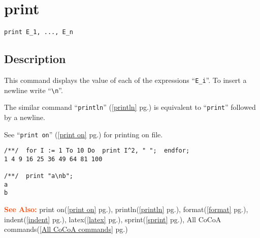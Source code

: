 \documentclass[a4paper]{mybook}
\newenvironment{command}{}{} %
\newcommand\SeeAlso{\par\textcolor{OrangeRed}{\textbf{\large See Also: }}}
\begin{document}
\section{print}
\label{print}
\begin{command} %


\begin{Verbatim}[label=syntax, rulecolor=\color{MidnightBlue},
frame=single]
print E_1, ..., E_n
\end{Verbatim}


\subsection*{Description}

This command displays the value of each of the expressions ``\verb&E_i&''.
To insert a newline write ``\verb&\n&''.
\par 
The similar command ``\verb&println&'' (\ref{println} pg.\pageref{println}) is equivalent to ``\verb&print&''
followed by a newline.
\par 
See ``\verb&print on&'' (\ref{print on} pg.\pageref{print on}) for printing on file.
\begin{Verbatim}[label=example, rulecolor=\color{PineGreen}, frame=single]
/**/  for I := 1 To 10 Do  print I^2, " ";  endfor;
1 4 9 16 25 36 49 64 81 100

/**/  print "a\nb";
a
b
\end{Verbatim}


\SeeAlso %
  print on(\ref{print on} pg.\pageref{print on}), 
    println(\ref{println} pg.\pageref{println}), 
    format(\ref{format} pg.\pageref{format}), 
    indent(\ref{indent} pg.\pageref{indent}), 
    latex(\ref{latex} pg.\pageref{latex}), 
    sprint(\ref{sprint} pg.\pageref{sprint}), 
    All CoCoA commands(\ref{All CoCoA commands} pg.\pageref{All CoCoA commands})
\end{command} %
\end{document}
